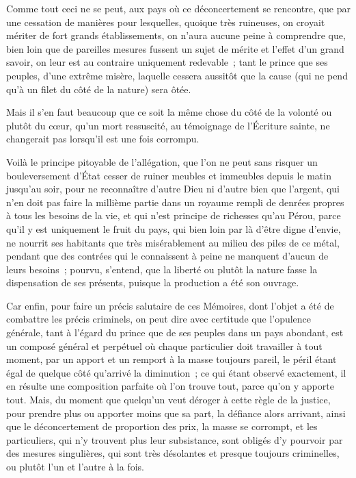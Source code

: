 \documentclass[french,twoside]{book} %
\begin{document}
Comme tout ceci ne se peut, aux pays où ce déconcertement se rencontre, que par une cessation de manières pour lesquelles, quoique très ruineuses, on croyait mériter de fort grands établissements, on n’aura aucune peine à comprendre que, bien loin que de pareilles mesures fussent un sujet de mérite et l’effet d’un grand savoir, on leur est au contraire uniquement redevable ; tant le prince que ses peuples, d’une extrême misère, laquelle cessera aussitôt que la cause (qui ne pend qu’à un filet du côté de la nature) sera ôtée.\par
Mais il s’en faut beaucoup que ce soit la même chose du côté de la volonté ou plutôt du cœur, qu’un mort ressuscité, au témoignage de l’Écriture sainte, ne changerait pas lorsqu’il est une fois corrompu.\par
Voilà le principe pitoyable de l’allégation, que l’on ne peut sans risquer un bouleversement d’État cesser de ruiner meubles et immeubles depuis le matin jusqu’au soir, pour ne reconnaître d’autre Dieu ni d’autre bien que l’argent, qui n’en doit pas faire la millième partie dans un royaume rempli de denrées propres à tous les besoins de la vie, et qui n’est principe de richesses qu’au Pérou, parce qu’il y est uniquement le fruit du pays, qui bien loin par là d’être digne d’envie, ne nourrit ses habitants que très misérablement au milieu des piles de ce métal, pendant que des contrées qui le connaissent à peine ne manquent d’aucun de leurs besoins ; pourvu, s’entend, que la liberté ou plutôt la nature fasse la dispensation de ses présents, puisque la production a été son ouvrage.\par
Car enfin, pour faire un précis salutaire de ces Mémoires, dont l’objet a été de combattre les précis criminels, on peut dire avec certitude que l’opulence générale, tant à l’égard du prince que de ses peuples dans un pays abondant, est un composé général et perpétuel où chaque particulier doit travailler à tout moment, par un apport et un remport à la masse toujours pareil, le péril étant égal de quelque côté qu’arrivé la diminution ; ce qui étant observé exactement, il en résulte une composition parfaite où l’on trouve tout, parce qu’on y apporte tout. Mais, du moment que quelqu’un veut déroger à cette règle de la justice, pour prendre plus ou apporter moins que sa part, la défiance alors arrivant, ainsi que le déconcertement de proportion des prix, la masse se corrompt, et les particuliers, qui n’y trouvent plus leur subsistance, sont obligés d’y pourvoir par des mesures singulières, qui sont très désolantes et presque toujours criminelles, ou plutôt l’un et l’autre à la fois.\par
\end{document}
